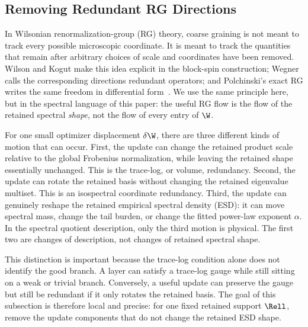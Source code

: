 \subsection{Removing Redundant RG Directions}
\label{sxn:redundant_rg_directions}

In Wilsonian renormalization-group (RG) theory, coarse graining is not meant to track every possible microscopic coordinate.  It is meant to track the quantities that remain after arbitrary choices of scale and coordinates have been removed.  Wilson and Kogut make this idea explicit in the block-spin construction; Wegner calls the corresponding directions redundant operators; and Polchinski's exact RG writes the same freedom in differential form~\cite{WilsonKogut1974,Wegner,Polchinski1984}.  We use the same principle here, but in the spectral language of this paper: the useful RG flow is the flow of the retained spectral \emph{shape}, not the flow of every entry of \(\W\).

For one small optimizer displacement \(\delta\W\), there are three different kinds of motion that can occur.  First, the update can change the retained product scale relative to the global Frobenius normalization, while leaving the retained shape essentially unchanged.  This is the trace-log, or volume, redundancy.  Second, the update can rotate the retained basis without changing the retained eigenvalue multiset.  This is an isospectral coordinate redundancy.  Third, the update can genuinely reshape the retained empirical spectral density (ESD): it can move spectral mass, change the tail burden, or change the fitted power-law exponent \(\alpha\).  In the spectral quotient description, only the third motion is physical.  The first two are changes of description, not changes of retained spectral shape.

This distinction is important because the trace-log condition alone does not identify the good branch.  A layer can satisfy a trace-log gauge while still sitting on a weak or trivial branch.  Conversely, a useful update can preserve the gauge but still be redundant if it only rotates the retained basis.  The goal of this subsection is therefore local and precise: for one fixed retained support \(\Rell\), remove the update components that do not change the retained ESD shape.

\begin{center}
  \label{fig:redundant_rg_directions_flow}
\end{center}

